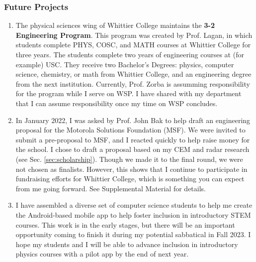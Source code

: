 \documentclass[../../../main.tex]{subfiles}
\begin{document}
\subsubsection{Future Projects}
\small
\begin{enumerate}
\item The physical sciences wing of Whittier College maintains the \textbf{3-2 Engineering Program}.  This program was created by Prof. Lagan, in which students complete PHYS, COSC, and MATH courses at Whittier College for three years.  The students complete two years of engineering courses at (for example) USC.  They receive two Bachelor's Degrees: physics, computer science, chemistry, or math from Whittier College, and an engineering degree from the next institution.  Currently, Prof. Zorba is assumming responsibility for the program while I serve on WSP.  I have shared with my department that I can assume responsibility once my time on WSP concludes.
\item In January 2022, I was asked by Prof. John Bak to help draft an engineering proposal for the Motorola Solutions Foundation (MSF).  We were invited to submit a pre-proposal to MSF, and I reacted quickly to help raise money for the school.  I chose to draft a proposal based on my CEM and radar research (see Sec. \ref{sec:scholarship}).  Though we made it to the final round, we were not chosen as finalists.  However, this shows that I continue to participate in fundraising efforts for Whittier College, which is something you can expect from me going forward.  See Supplemental Material for details.
\item I have assembled a diverse set of computer science students to help me create the Android-based mobile app to help foster inclusion in introductory STEM courses.  This work is in the early stages, but there will be an important opportunity coming to finish it during my potential sabbatical in Fall 2023.  I hope my students and I will be able to advance inclusion in introductory physics courses with a pilot app by the end of next year.
\end{enumerate}
\end{document}
